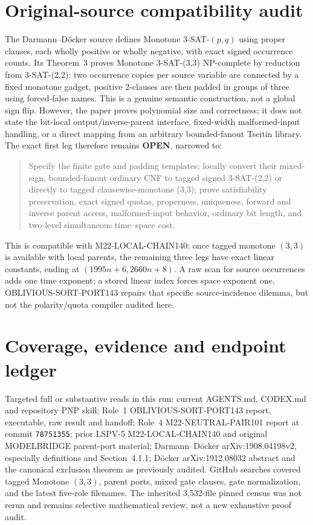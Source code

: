 \documentclass[11pt]{article}
\newcommand{\OPEN}{\textbf{OPEN}}
\begin{document}
\section{Original-source compatibility audit}
The Darmann--D\"ocker source defines Monotone 3-SAT-$(p,q)$ using proper clauses, each wholly positive or wholly negative, with exact signed occurrence counts.  Its Theorem~3 proves Monotone 3-SAT-(3,3) NP-complete by reduction from 3-SAT-(2,2): two occurrence copies per source variable are connected by a fixed monotone gadget, positive 2-clauses are then padded in groups of three using forced-false names.  This is a genuine semantic construction, not a global sign flip.  However, the paper proves polynomial size and correctness; it does not state the bit-local output/inverse-parent interface, fixed-width malformed-input handling, or a direct mapping from an arbitrary bounded-fanout Tseitin library.  The exact first leg therefore remains \OPEN, narrowed to:
\begin{quote}
Specify the finite gate and padding templates; locally convert their mixed-sign, bounded-fanout ordinary CNF to tagged signed 3-SAT-(2,2) or directly to tagged clausewise-monotone (3,3); prove satisfiability preservation, exact signed quotas, properness, uniqueness, forward and inverse parent access, malformed-input behavior, ordinary bit length, and two-level simultaneous time--space cost.
\end{quote}

This is compatible with M22-LOCAL-CHAIN140: once tagged monotone $(3,3)$ is available with local parents, the remaining three legs have exact linear constants, ending at $(1995n+6,2660n+8)$.  A raw scan for source occurrences adds one time exponent; a stored linear index forces space exponent one.  OBLIVIOUS-SORT-PORT143 repairs that specific source-incidence dilemma, but not the polarity/quota compiler audited here.

\section{Coverage, evidence and endpoint ledger}
Targeted full or substantive reads in this run: current AGENTS.md, CODEX.md and repository PNP skill; Role~1 OBLIVIOUS-SORT-PORT143 report, executable, raw result and handoff; Role~4 M22-NEUTRAL-PAIR101 report at commit \texttt{78751355}; prior LSPV-5 M22-LOCAL-CHAIN140 and original MODELBRIDGE parent-port material; Darmann--D\"ocker arXiv:1908.04198v2, especially definitions and Section~4.1.1; D\"ocker arXiv:1912.08032 abstract and the canonical exclusion theorem as previously audited.  GitHub searches covered tagged Monotone $(3,3)$, parent ports, mixed gate clauses, gate normalization, and the latest five-role filenames.  The inherited 3,532-file pinned census was not rerun and remains selective mathematical review, not a new exhaustive proof audit.
\end{document}
